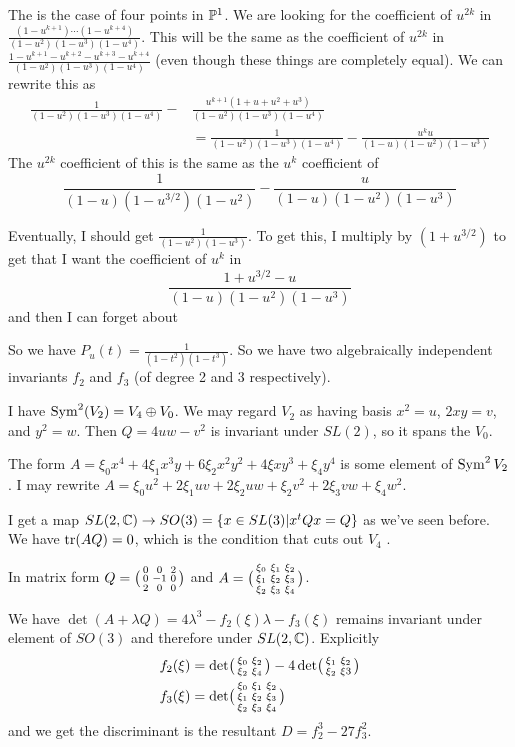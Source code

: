 \begin{example}[$d=4$]
 The is the case of four points in $\mathbb{P}^1$. We are looking for the coefficient of $u^{2k}$ in $\frac{(1-u^{k+1})\cdots(1-u^{k+4})}{(1-u^2)(1-u^3)(1-u^4)}$. This will be the same as the coefficient of $u^{2k}$ in $\frac{1-u^{k+1}-u^{k+2}-u^{k+3}-u^{k+4}}{(1-u^2)(1-u^3)(1-u^4)}$ (even though these things are completely equal). We can rewrite this as
 \begin{align*}
  \frac{1}{(1-u^2)(1-u^3)(1-u^4)} - & \frac{u^{k+1}(1+u+u^2+u^3)}{(1-u^2)(1-u^3)(1-u^4)} \\
  &=
  \frac{1}{(1-u^2)(1-u^3)(1-u^4)} - \frac{u^k u}{(1-u)(1-u^2)(1-u^3)}
 \end{align*}
 The $u^{2k}$ coefficient of this is the same as the $u^k$ coefficient of
 \[
  \frac{1}{(1-u)(1-u^{3/2})(1-u^2)} - \frac{u}{(1-u)(1-u^2)(1-u^3)}  
 \]
 
 Eventually, I should get $\frac{1}{(1-u^2)(1-u^3)}$. To get this, I multiply by $(1+u^{3/2})$ to get that I want the coefficient of $u^k$ in
 \[
  \frac{1+u^{3/2}-u}{(1-u)(1-u^2)(1-u^3)}
 \]
 and then I can forget about 
 
 So we have $P_u(t)=\frac{1}{(1-t^2)(1-t^3)}$. So we have two algebraically independent invariants $f_2$ and $f_3$ (of degree 2 and 3 respectively).
 
 I have $\operatorname{Sym}^2(V_2)=V_4\oplus V_0$. We may regard $V_2$ as having basis $x^2=u$, $2xy=v$, and $y^2=w$. Then $Q=4uw-v^2$ is invariant under $SL(2)$, so it spans the $V_0$.
 
 The form $A=\xi_0 x^4+4\xi_1 x^3y+6\xi_2 x^2y^2+4\xi xy^3+\xi_4y^4$ is some element of $\operatorname{Sym}^2 V_2$. I may rewrite $A=\xi_0u^2+2\xi_1 uv+2\xi_2 uw+\xi_2 v^2+2\xi_3 vw+\xi_4w^2$.
 
 I get a map $SL(2,\mathbb{C})\to SO(3)=\{x\in SL(3)|x^tQx=Q\}$ as we've seen before. We have $\operatorname{tr}(AQ)=0$, which is the condition that cuts out $V_4$ .
 
 In matrix form $Q=\bigl(\begin{smallmatrix} 0&0&2\\ 0&-1&0\\ 2&0&0 \end{smallmatrix}\bigr)$ and $A=\bigl(\begin{smallmatrix} \xi_0&\xi_1&\xi_2\\ \xi_1&\xi_2&\xi_3\\ \xi_2&\xi_3&\xi_4 \end{smallmatrix}\bigr)$.
 
 We have $\det(A+\lambda Q)=4\lambda^3-f_2(\xi)\lambda-f_3(\xi)$ remains invariant under element of $SO(3)$ and therefore under $SL(2,\mathbb{C})$. Explicitly
 \begin{align*}
  f_2(\xi) &=\det\bigl(\begin{smallmatrix} \xi_0& \xi_2\\ \xi_2&\xi_4 \end{smallmatrix}\bigr)-4\det\bigl(\begin{smallmatrix} \xi_1&\xi_2\\ \xi_2&\xi3 \end{smallmatrix}\bigr)\\
  f_3(\xi) &= \det\bigl(\begin{smallmatrix} \xi_0&\xi_1&\xi_2\\ \xi_1&\xi_2&\xi_3\\ \xi_2&\xi_3&\xi_4 \end{smallmatrix}\bigr)
 \end{align*}
  and we get the discriminant is the resultant $D=f_2^3-27f_3^2$.
\end{example}

